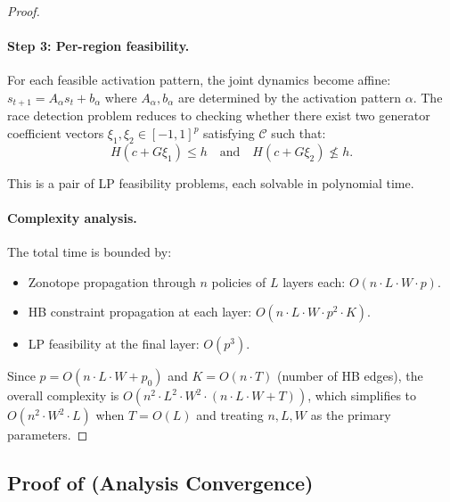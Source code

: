 \documentclass[11pt]{article}
\newcommand{\calC}{\mathcal{C}}
\begin{document}
\begin{proof}
\paragraph{Step 3: Per-region feasibility.}
For each feasible activation pattern, the joint dynamics become affine:
$s_{t+1} = A_\alpha s_t + b_\alpha$ where $A_\alpha, b_\alpha$ are determined
by the activation pattern $\alpha$. The race detection problem reduces to
checking whether there exist two generator coefficient vectors
$\xi_1, \xi_2 \in [-1,1]^p$ satisfying $\calC$ such that:
\[
  H(c + G\xi_1) \leq h \quad \text{and} \quad H(c + G\xi_2) \not\leq h.
\]

This is a pair of LP feasibility problems, each solvable in polynomial time.

\paragraph{Complexity analysis.}
The total time is bounded by:
\begin{itemize}[nosep]
\item Zonotope propagation through $n$ policies of $L$ layers each: $O(n \cdot L \cdot W \cdot p)$.
\item HB constraint propagation at each layer: $O(n \cdot L \cdot W \cdot p^2 \cdot K)$.
\item LP feasibility at the final layer: $O(p^3)$.
\end{itemize}
Since $p = O(n \cdot L \cdot W + p_0)$ and $K = O(n \cdot T)$ (number of HB edges),
the overall complexity is $O(n^2 \cdot L^2 \cdot W^2 \cdot (n \cdot L \cdot W + T))$,
which simplifies to $O(n^2 \cdot W^2 \cdot L)$ when $T = O(L)$ and treating
$n, L, W$ as the primary parameters.
\end{proof}


\subsection{Proof of \texorpdfstring{}{Theorem 3.1} (Analysis Convergence)}
\end{document}
